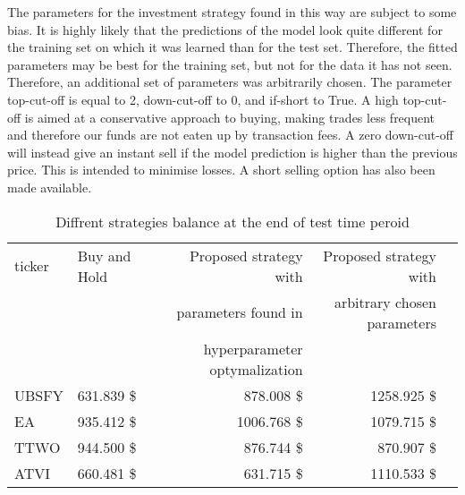 \documentclass[11pt]{article} %
\begin{document}
The parameters for the investment strategy found in this way are subject to some bias. It is highly likely that the predictions of the model look quite different for the training set on which it was learned than for the test set. Therefore, the fitted parameters may be best for the training set, but not for the data it has not seen. Therefore, an additional set of parameters was arbitrarily chosen. The parameter top-cut-off is equal to 2, down-cut-off to 0, and if-short to True. A high top-cut-off is aimed at a conservative approach to buying, making trades less frequent and therefore our funds are not eaten up by transaction fees. A zero down-cut-off will instead give an instant sell if the model prediction is higher than the previous price. This is intended to minimise losses. A short selling option has also been made available.  

\begin{table}[H]
\centering
\caption{Diffrent strategies balance at the end of test time peroid}
\begin{tabular}{llrrr}
\toprule
 ticker &  Buy and Hold &  Proposed strategy with  &  Proposed strategy with  \\
  &        &                                        parameters found in  &                                           arbitrary chosen parameters \\
  &        &                                         hyperparameter optymalization &                                            \\

 \midrule
  UBSFY &       631.839 \$&                                            878.008 \$ &                                           1258.925 \$\\
    EA &       935.412 \$&                                           1006.768 \$&                                           1079.715 \$\\
   TTWO &       944.500 \$&                                            876.744 \$&                                            870.907 \$\\
   ATVI &       660.481 \$&                                            631.715 \$&                                           1110.533 \$\\
\bottomrule
\end{tabular}
\end{table}



\begin{figure}[H]
\begin{adjustbox}{width=1.3\textwidth,center}

\end{adjustbox}
\end{figure}
\end{document}
